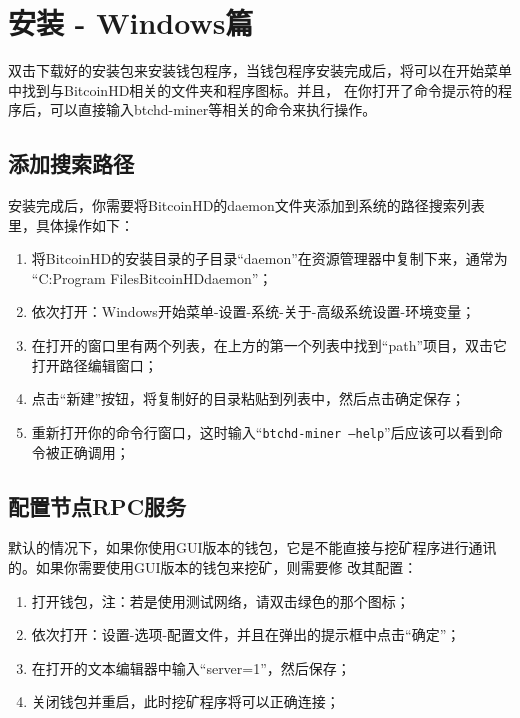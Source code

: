 \section{安装 - Windows篇}
\begin{flushleft}
    双击下载好的安装包来安装钱包程序，当钱包程序安装完成后，将可以在开始菜单中找到与BitcoinHD相关的文件夹和程序图标。并且，
    在你打开了命令提示符的程序后，可以直接输入btchd-miner等相关的命令来执行操作。
\end{flushleft}
\subsection{添加搜索路径}
\begin{flushleft}
    安装完成后，你需要将BitcoinHD的daemon文件夹添加到系统的路径搜索列表里，具体操作如下：
\end{flushleft}
\begin{enumerate}
    \item 将BitcoinHD的安装目录的子目录``daemon''在资源管理器中复制下来，通常为
        ``C:Program FilesBitcoinHDdaemon''；
    \item 依次打开：Windows开始菜单-设置-系统-关于-高级系统设置-环境变量；
    \item 在打开的窗口里有两个列表，在上方的第一个列表中找到``path''项目，双击它打开路径编辑窗口；
    \item 点击``新建''按钮，将复制好的目录粘贴到列表中，然后点击确定保存；
    \item 重新打开你的命令行窗口，这时输入``\texttt{btchd-miner --help}''后应该可以看到命令被正确调用；
\end{enumerate}
\subsection{配置节点RPC服务}
\begin{flushleft}
    默认的情况下，如果你使用GUI版本的钱包，它是不能直接与挖矿程序进行通讯的。如果你需要使用GUI版本的钱包来挖矿，则需要修
    改其配置：
\end{flushleft}
\begin{enumerate}
    \item 打开钱包，注：若是使用测试网络，请双击绿色的那个图标；
    \item 依次打开：设置-选项-配置文件，并且在弹出的提示框中点击``确定''；
    \item 在打开的文本编辑器中输入``server=1''，然后保存；
    \item 关闭钱包并重启，此时挖矿程序将可以正确连接；
\end{enumerate}
